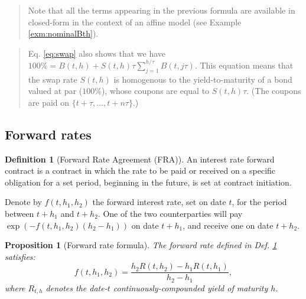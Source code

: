 \documentclass[
  12pt,
]{book}
\newtheorem{proposition}{Proposition}[chapter]
\theoremstyle{definition}
\newtheorem{definition}{Definition}[chapter]
\theoremstyle{definition}
\theoremstyle{definition}
\theoremstyle{definition}
\theoremstyle{remark}
\begin{document}
\begin{quote}
Note that all the terms appearing in the previous formula are available in closed-form in the context of an affine model (see Example \ref{exm:nominalBth}).
\end{quote}

\begin{quote}
Eq. \eqref{eq:swap} also shows that we have \(100\% = B(t,h) + S(t,h) \tau \sum_{j=1}^{h/\tau} B(t,j\tau)\). This equation means that the swap rate \(S(t,h)\) is homogenous to the yield-to-maturity of a bond valued at par (\(100\%\)), whose coupons are equal to \(S(t,h) \tau\). (The coupons are paid on \(\{t+\tau,\dots,t+n\tau\}\).)
\end{quote}

\hypertarget{FWD}{%
\subsection{Forward rates}\label{FWD}}

\begin{definition}[Forward Rate Agreement (FRA)]
\protect\hypertarget{def:FWD}{}\label{def:FWD}An interest rate forward contract is a contract in which the rate to be paid or received on a specific obligation for a set period, beginning in the future, is set at contract initiation.

Denote by \(f(t,h_1,h_2)\) the forward interest rate, set on date \(t\), for the period between \(t+h_1\) and \(t+h_2\). One of the two counterparties will pay \(\exp(-f(t,h_1,h_2)(h_2 - h_1))\) on date \(t+h_1\), and receive one on date \(t+h_2\).
\end{definition}

\begin{proposition}[Forward rate formula]
\protect\hypertarget{prp:fwd}{}\label{prp:fwd}The forward rate defined in Def. \ref{def:FWD} satisfies:
\begin{equation}
\boxed{f(t,h_1,h_2) = \frac{h_2 R(t,h_2) - h_1 R(t,h_1)}{h_2 - h_1},}\label{eq:forward}
\end{equation}
where \(R_{t,h}\) denotes the date-\(t\) continuously-compounded yield of maturity \(h\).
\end{proposition}
\end{document}
